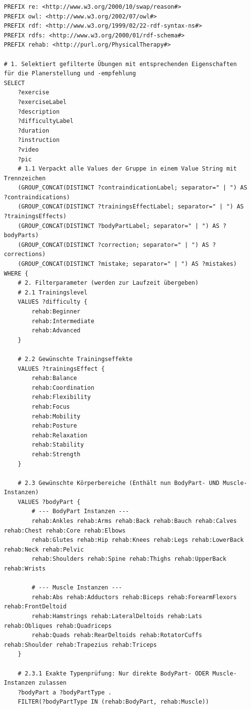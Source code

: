 \begin{lstlisting}[caption={SPARQL-Query der Klasse \texttt{ExerciseAPI} für Planerstellung und Planempfehlung}, label={lst:sparql_exercise}]
PREFIX re: <http://www.w3.org/2000/10/swap/reason#>
PREFIX owl: <http://www.w3.org/2002/07/owl#>
PREFIX rdf: <http://www.w3.org/1999/02/22-rdf-syntax-ns#>
PREFIX rdfs: <http://www.w3.org/2000/01/rdf-schema#>
PREFIX rehab: <http://purl.org/PhysicalTherapy#>

# 1. Selektiert gefilterte Übungen mit entsprechenden Eigenschaften für die Planerstellung und -empfehlung
SELECT
    ?exercise
    ?exerciseLabel
    ?description
    ?difficultyLabel
    ?duration
    ?instruction
    ?video
    ?pic
    # 1.1 Verpackt alle Values der Gruppe in einem Value String mit Trennzeichen
    (GROUP_CONCAT(DISTINCT ?contraindicationLabel; separator=" | ") AS ?contraindications)
    (GROUP_CONCAT(DISTINCT ?trainingsEffectLabel; separator=" | ") AS ?trainingsEffects)
    (GROUP_CONCAT(DISTINCT ?bodyPartLabel; separator=" | ") AS ?bodyParts)
    (GROUP_CONCAT(DISTINCT ?correction; separator=" | ") AS ?corrections)
    (GROUP_CONCAT(DISTINCT ?mistake; separator=" | ") AS ?mistakes)
WHERE {
    # 2. Filterparameter (werden zur Laufzeit übergeben)
    # 2.1 Trainingslevel
    VALUES ?difficulty {
        rehab:Beginner
        rehab:Intermediate
        rehab:Advanced
    }

    # 2.2 Gewünschte Trainingseffekte
    VALUES ?trainingsEffect {
        rehab:Balance
        rehab:Coordination
        rehab:Flexibility
        rehab:Focus
        rehab:Mobility
        rehab:Posture
        rehab:Relaxation
        rehab:Stability
        rehab:Strength
    }

    # 2.3 Gewünschte Körperbereiche (Enthält nun BodyPart- UND Muscle-Instanzen)
    VALUES ?bodyPart {
        # --- BodyPart Instanzen ---
        rehab:Ankles rehab:Arms rehab:Back rehab:Bauch rehab:Calves rehab:Chest rehab:Core rehab:Elbows
        rehab:Glutes rehab:Hip rehab:Knees rehab:Legs rehab:LowerBack rehab:Neck rehab:Pelvic
        rehab:Shoulders rehab:Spine rehab:Thighs rehab:UpperBack rehab:Wrists

        # --- Muscle Instanzen ---
        rehab:Abs rehab:Adductors rehab:Biceps rehab:ForearmFlexors rehab:FrontDeltoid
        rehab:Hamstrings rehab:LateralDeltoids rehab:Lats rehab:Obliques rehab:Quadriceps
        rehab:Quads rehab:RearDeltoids rehab:RotatorCuffs rehab:Shoulder rehab:Trapezius rehab:Triceps
    }

    # 2.3.1 Exakte Typenprüfung: Nur direkte BodyPart- ODER Muscle-Instanzen zulassen
    ?bodyPart a ?bodyPartType .
    FILTER(?bodyPartType IN (rehab:BodyPart, rehab:Muscle))


\end{lstlisting}
